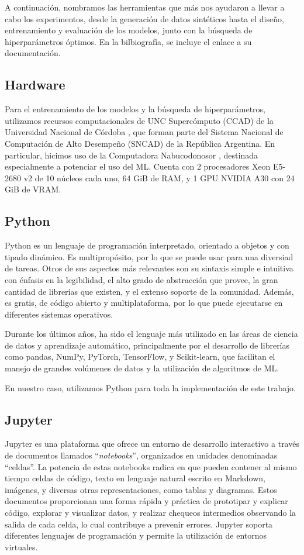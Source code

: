 \documentclass[../../main.tex]{subfiles}
\begin{document}
A continuación, nombramos las herramientas que más nos ayudaron a llevar a cabo los
experimentos, desde la generación de datos sintéticos hasta el diseño, entrenamiento y
evaluación de los modelos, junto con la búsqueda de hiperparámetros óptimos. En la
bilbiografía, se incluye el enlace a su documentación.

\subsection{Hardware}
Para el entrenamiento de los modelos y la búsqueda de hiperparámetros, utilizamos recursos
computacionales de UNC Supercómputo (CCAD) de la Universidad Nacional de Córdoba
\cite{ccad}, que forman parte del Sistema Nacional de Computación de Alto Desempeño
(SNCAD) de la República Argentina. En particular, hicimos uso de la Computadora
Nabucodonosor \cite{nabu}, destinada especialmente a potenciar el uso del ML. Cuenta con 2
procesadores Xeon E5-2680 v2 de 10 núcleos cada uno, 64 GiB de RAM, y 1 GPU NVIDIA A30 con
24 GiB de VRAM.

\subsection{Python}
Python \cite{python-docs} es un lenguaje de programación interpretado, orientado a objetos
y con tipado dinámico. Es multipropósito, por lo que se puede usar para una diversiad de
tareas. Otros de sus aspectos más relevantes son su sintaxis simple e intuitiva con
énfasis en la legibilidad, el alto grado de abstracción que provee, la gran cantidad de
librerías que existen, y el extenso soporte de la comunidad. Además, es gratis, de código
abierto y multiplataforma, por lo que puede ejecutarse en diferentes sistemas operativos.

Durante los últimos años, ha sido el lenguaje más utilizado en las áreas de ciencia
de datos y aprendizaje automático, principalmente por el desarrollo de librerías
como pandas, NumPy, PyTorch, TensorFlow, y Scikit-learn, que facilitan el manejo
de grandes volúmenes de datos y la utilización de algoritmos de ML.

En nuestro caso, utilizamos Python para toda la implementación de este trabajo.

\subsection{Jupyter}
Jupyter \cite{jupyter-docs} es una plataforma que ofrece un entorno de desarrollo
interactivo a través de documentos llamados ``\textit{notebooks}'', organizados en
unidades denominadas ``celdas''. La potencia de estas notebooks radica en que pueden
contener al mismo tiempo celdas de código, texto en lenguaje natural escrito en Markdown,
imágenes, y diversas otras representaciones, como tablas y diagramas. Estos documentos
proporcionan una forma rápida y práctica de prototipar y explicar código, explorar y
visualizar datos, y realizar chequeos intermedios observando la salida de cada celda, lo
cual contribuye a prevenir errores. Jupyter soporta diferentes lenguajes de programación y
permite la utilización de entornos virtuales.
\end{document}
